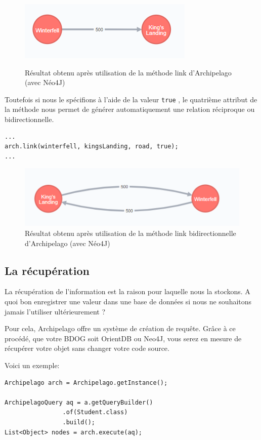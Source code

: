 \documentclass[a4paper,fleqn,12pt]{report}
\begin{document}
\begin{figure}[!ht]
\centering
\includegraphics[scale=1.2]{figures/Rel.png}
\label{fig:Relation}
\caption{Résultat obtenu après utilisation de la méthode link d'Archipelago (avec Néo4J)}
\end{figure}

Toutefois si nous le spécifions à l'aide de la valeur \texttt{true} , le quatrième attribut de la méthode nous permet de générer automatiquement une relation réciproque ou bidirectionnelle. 

\begin{lstlisting}
...
arch.link(winterfell, kingsLanding, road, true);
...
\end{lstlisting}


\begin{figure}[!ht]
\centering
\includegraphics[scale=1.2]{figures/RelBidir.png}
\caption{Résultat obtenu après utilisation de la méthode link bidirectionnelle d'Archipelago (avec Néo4J)}
\label{fig:RelationBiDir}
\end{figure}

\subsection{La récupération}

La récupération de l'information est la raison pour laquelle nous la stockons. A quoi bon enregistrer une valeur dans une base de données si nous ne souhaitons jamais l'utiliser ultérieurement ?

Pour cela, Archipelago offre un système de création de requête. Grâce à ce procédé, que votre BDOG soit OrientDB ou Neo4J, vous serez en mesure de récupérer votre objet sans changer votre code source. 

Voici un exemple:

\begin{lstlisting}
Archipelago arch = Archipelago.getInstance();

ArchipelagoQuery aq = a.getQueryBuilder()
                .of(Student.class)
                .build();
List<Object> nodes = arch.execute(aq);
\end{lstlisting}
\end{document}
